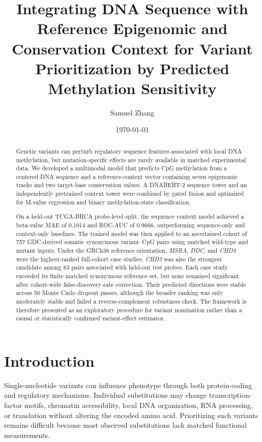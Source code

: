 \documentclass[10pt,letterpaper,twocolumn]{article}
\title{Integrating DNA Sequence with Reference Epigenomic and Conservation Context for Variant Prioritization by Predicted Methylation Sensitivity}
\author{Samuel Zhang}
\date{\today}
\begin{document}
\maketitle

\begin{abstract}
Genetic variants can perturb regulatory sequence features associated
with local DNA methylation, but mutation-specific effects are rarely
available in matched experimental data. We developed a multimodal model
that predicts CpG methylation from a centered DNA sequence and a
reference-context vector containing seven epigenomic tracks and two
target-base conservation values. A DNABERT-2 sequence tower and an
independently pretrained context tower were combined by gated fusion
and optimized for M-value regression and binary methylation-state
classification.

On a held-out TCGA-BRCA probe-level split, the sequence--context model
achieved a beta-value MAE of 0.1014 and ROC-AUC of 0.9666, outperforming
sequence-only and context-only baselines. The trained model was then
applied to an ascertained cohort of 757 GDC-derived somatic synonymous
variant--CpG pairs using matched wild-type and mutant inputs. Under the
GRCh38 reference orientation, \textit{MSRA}, \textit{DDC}, and
\textit{CHD5} were the highest-ranked full-cohort case studies;
\textit{CHD5} was also the strongest candidate among 83 pairs associated
with held-out test probes. Each case study exceeded its finite matched
synonymous reference set, but none remained significant after
cohort-wide false-discovery-rate correction. Their predicted directions
were stable across 50 Monte Carlo dropout passes, although the broader
ranking was only moderately stable and failed a reverse-complement
robustness check. The framework is therefore presented as an
exploratory procedure for variant nomination rather than a causal or
statistically confirmed variant-effect estimator.
\end{abstract}

\section{Introduction}

Single-nucleotide variants can influence phenotype through both
protein-coding and regulatory mechanisms. Individual substitutions may
change transcription-factor motifs, chromatin accessibility, local DNA
organization, RNA processing, or translation without altering the
encoded amino acid. Prioritizing such variants remains difficult
because most observed substitutions lack matched functional
measurements.
\end{document}
